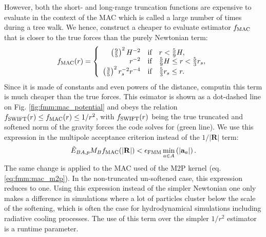 However, both the short- and long-range truncation functions are
expensive to evaluate in the context of the MAC which is called a
large number of times during a tree walk. We hence, construct a
cheaper to evaluate estimator $f_{\rm MAC}$ that is closer to the true
forces than the purely Newtonian term:
\begin{align}
f_{\rm MAC}(r) =
\left\lbrace\begin{array}{rcl}
  \left(\frac{9}{5}\right)^2 H^{-2} & \mbox{if} & r <
  \frac{5}{9}H,\\
  r^{-2} & \mbox{if} & \frac{5}{9}H \leq r < \frac{5}{3}r_s, \\
  \left(\frac{3}{5}\right)^2 r_s^{-2} r^{-4} & \mbox{if} & \frac{5}{3}r_s \leq r. \\
\end{array}
\right.
\label{eq:fmm:f_mac}
\end{align}
Since it is made of constants and even powers of the distance,
computin this term is much cheaper than the true forces.  This
esimator is shown as a dot-dashed line on
Fig. \ref{fig:fmm:mac_potential} and obeys the relation $f_{\rm
  SWIFT}(r) \leq f_{\rm MAC}(r) \leq 1/r^2$, with $f_{\rm SWIFT}(r)$
being the true truncated and softened norm of the gravity forces the
code solves for (green line). We use this expression in the multipole
acceptance criterion instead of the $1/|\mathbf{R}|$ term:
\begin{equation}
  \tilde{E}_{BA,p} M_Bf_{\rm MAC}(|\mathbf{R}|) < \epsilon_{\rm FMM} \min_{a\in
    A}\left(|\mathbf{a}_a|\right).
  \label{eq:fmm:mac_f_mac}  
\end{equation}
The same change is applied to the MAC used of the M2P kernel
(eq. \ref{eq:fmm:mac_m2p}). In the non-truncated un-softened case, this
expression reduces to \citep{Dehnen2014} one. Using this expression
instead of the simpler Newtonian one only makes a difference in
simulations where a lot of particles cluster below the scale of the
softening, which is often the case for hydrodynamical simulations
including radiative cooling processes. The use of this term over the
simpler $1/r^2$ estimator is a runtime parameter.

